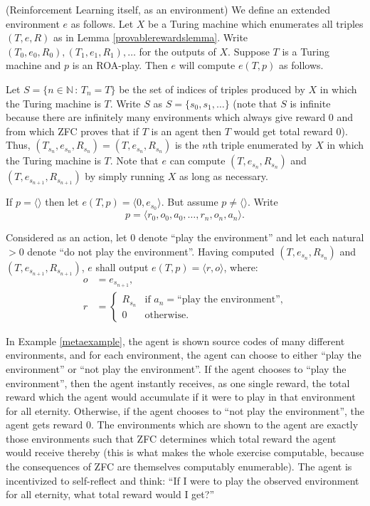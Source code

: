 \documentclass[runningheads]{llncs}
\begin{document}
\begin{example}
\label{metaexample}
    (Reinforcement Learning itself, as an environment)
    We define an extended environment $e$ as follows.
    Let $X$ be a Turing machine which enumerates all triples
    $(T,e,R)$ as in Lemma \ref{provablerewardslemma}.
    Write $(T_0,e_0,R_0),(T_1,e_1,R_1),\ldots$ for the outputs of $X$.
    Suppose $T$ is a Turing machine and
    $p$ is an ROA-play.
    Then $e$ will compute $e(T,p)$ as follows.

    Let $S=\{n\in\mathbb N\,:\,T_n=T\}$ be the set of indices of
    triples produced by $X$ in which the Turing machine is $T$.
    Write $S$ as $S=\{s_0,s_1,\ldots\}$ (note that $S$ is infinite because
    there are infinitely many environments which always give reward $0$ and from which
    ZFC proves that if $T$ is an agent then $T$ would get total reward $0$).
    Thus, $(T_{s_n},e_{s_n},R_{s_n})=(T,e_{s_n},R_{s_n})$ is the $n$th triple enumerated
    by $X$ in which the Turing machine is $T$. Note that $e$ can compute $(T,e_{s_n},R_{s_n})$
    and $(T,e_{s_{n+1}},R_{s_{n+1}})$ by
    simply running $X$ as long as necessary.

    If $p=\langle\rangle$ then let $e(T,p)=\langle 0, e_{s_0}\rangle$.
    But assume $p\not=\langle\rangle$.
    Write 
    \[
        p=\langle r_0,o_0,a_0,\ldots,r_n,o_n,a_n\rangle.
    \]

    Considered as an action, let $0$ denote ``play the environment''
    and let each natural $>0$ denote ``do not play the environment''.
    Having computed $(T,e_{s_n},R_{s_n})$ and $(T,e_{s_{n+1}},R_{s_{n+1}})$,
    $e$ shall output $e(T,p)=\langle r,o\rangle$, where:
    \begin{align*}
        o &= e_{s_{n+1}},\\
        r &=
        \begin{cases}
            R_{s_n} &\mbox{if $a_n=\mbox{``play the environment''}$,}\\
            0 &\mbox{otherwise.}
        \end{cases}
    \end{align*}
\end{example}

In Example \ref{metaexample}, the agent is shown source codes of many different
environments, and for each environment, the agent can choose to either ``play the
environment'' or ``not play the environment''. If the agent chooses to ``play the
environment'', then the agent instantly receives, as one single reward,
the total reward which the agent would
accumulate if it were to play in that environment for all eternity. Otherwise, if
the agent chooses to ``not play the environment'', the agent gets reward $0$.
The environments which are shown to the agent are exactly those environments such
that ZFC determines which total reward the agent would receive thereby (this is
what makes the whole exercise computable, because the consequences of ZFC are
themselves computably enumerable). The agent is incentivized to self-reflect and think:
``If I were to play the observed environment for all eternity, what total reward would
I get?''
\end{document}
